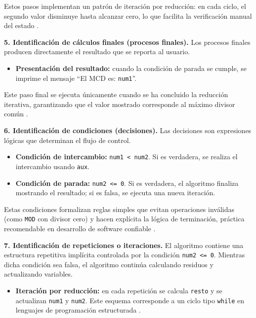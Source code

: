 \documentclass[12pt,twoside]{book}
\begin{document}
						\noindent
						Estos pasos implementan un patrón de iteración por reducción: en cada ciclo, el segundo valor disminuye hasta alcanzar cero, lo que facilita la verificación manual del estado \cite{Lister2004Learning,Qian2018Students}.
						
						\noindent
						\textbf{5. Identificación de cálculos finales (procesos finales).}
						Los procesos finales producen directamente el resultado que se reporta al usuario.
						
						\begin{itemize}
							\item \textbf{Presentación del resultado:} cuando la condición de parada se cumple, se imprime el mensaje ``El MCD es: \texttt{num1}''.
						\end{itemize}
						
						\noindent
						Este paso final se ejecuta únicamente cuando se ha concluido la reducción iterativa, garantizando que el valor mostrado corresponde al máximo divisor común \cite{Cormen2022Introduction,Sebesta2018Concepts}.
						
						\noindent
						\textbf{6. Identificación de condiciones (decisiones).}
						Las decisiones son expresiones lógicas que determinan el flujo de control.
						
						\begin{itemize}
							\item \textbf{Condición de intercambio:} \texttt{num1 < num2}. Si es verdadera, se realiza el intercambio usando \texttt{aux}.
							\item \textbf{Condición de parada:} \texttt{num2 <= 0}. Si es verdadera, el algoritmo finaliza mostrando el resultado; si es falsa, se ejecuta una nueva iteración.
						\end{itemize}
						
						\noindent
						Estas condiciones formalizan reglas simples que evitan operaciones inválidas (como \texttt{MOD} con divisor cero) y hacen explícita la lógica de terminación, práctica recomendable en desarrollo de software confiable \cite{Pressman2019Software,Sommerville2015Software}.
						
						\noindent
						\textbf{7. Identificación de repeticiones o iteraciones.}
						El algoritmo contiene una estructura repetitiva implícita controlada por la condición \texttt{num2 <= 0}. Mientras dicha condición sea falsa, el algoritmo continúa calculando residuos y actualizando variables.
						
						\begin{itemize}
							\item \textbf{Iteración por reducción:} en cada repetición se calcula \texttt{resto} y se actualizan \texttt{num1} y \texttt{num2}. Este esquema corresponde a un ciclo tipo \texttt{while} en lenguajes de programación estructurada \cite{Sebesta2018Concepts,Farrell2018Programming}.
						\end{itemize}
						
\end{document}

